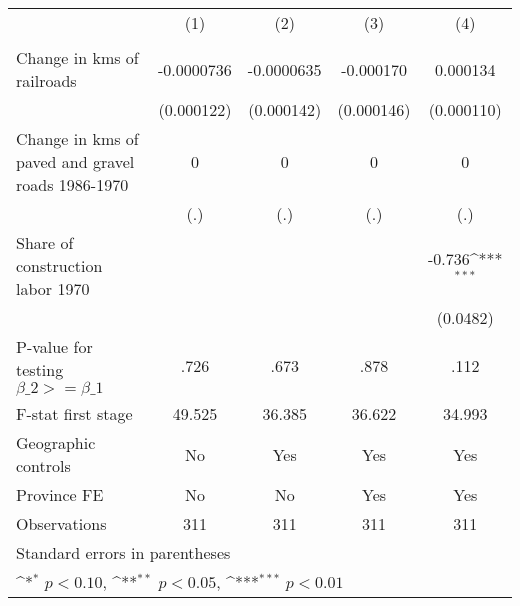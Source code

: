 {
\def\sym#1{\ifmmode^{#1}\else\(^{#1}\)\fi}
\begin{tabular}{l*{4}{c}}
\hline\hline
                &\multicolumn{1}{c}{(1)}&\multicolumn{1}{c}{(2)}&\multicolumn{1}{c}{(3)}&\multicolumn{1}{c}{(4)}\\
                &\multicolumn{1}{c}{}&\multicolumn{1}{c}{}&\multicolumn{1}{c}{}&\multicolumn{1}{c}{}\\
\hline
Change in kms of railroads&-0.0000736         &-0.0000635         &-0.000170         & 0.000134         \\
                &(0.000122)         &(0.000142)         &(0.000146)         &(0.000110)         \\
[1em]
Change in kms of paved and gravel roads 1986-1970&        0         &        0         &        0         &        0         \\
                &      (.)         &      (.)         &      (.)         &      (.)         \\
[1em]
Share of construction labor 1970&                  &                  &                  &   -0.736\sym{***}\\
                &                  &                  &                  & (0.0482)         \\
\hline
P-value for testing $\beta\_{2} >= \beta\_{1}$&     .726         &     .673         &     .878         &     .112         \\
F-stat first stage&   49.525         &   36.385         &   36.622         &   34.993         \\
Geographic controls&       No         &      Yes         &      Yes         &      Yes         \\
Province FE     &       No         &       No         &      Yes         &      Yes         \\
Observations    &      311         &      311         &      311         &      311         \\
\hline\hline
\multicolumn{5}{l}{\footnotesize Standard errors in parentheses}\\
\multicolumn{5}{l}{\footnotesize \sym{*} \(p<0.10\), \sym{**} \(p<0.05\), \sym{***} \(p<0.01\)}\\
\end{tabular}
}
